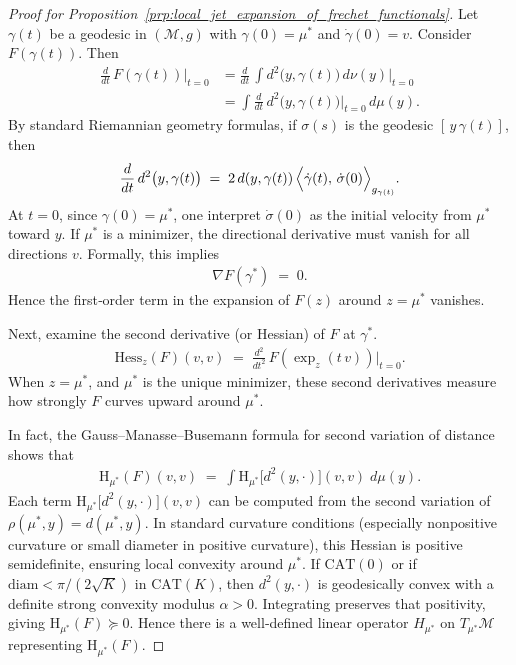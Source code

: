 \begin{proof}[Proof for Proposition~\ref{prp:local_jet_expansion_of_frechet_functionals}]
    Let \(\gamma(t)\) be a geodesic in \((\mathcal{M},g)\) with \(\gamma(0)=\mu^*\) and \(\dot{\gamma}(0)=v\).
    Consider \(F(\gamma(t))\).
    Then
    \begin{align*}
        \frac{d}{dt}\,F(\gamma(t))
        \Big|_{t=0}
        &=
        \frac{d}{dt}\,\int d^2\bigl(y,\gamma(t)\bigr)\,d\nu(y)
        \Big|_{t=0} \\
        &=
        \int \frac{d}{dt}\,d^2\bigl(y,\gamma(t)\bigr)
        \Big|_{t=0}
        \,d\mu(y).
    \end{align*}
    By standard Riemannian geometry formulas, if \(\sigma(s)\) is the geodesic \([\,y\,\gamma(t)]\), then
    \begin{align*}
        \frac{d}{dt}\,d^2\bigl(y,\gamma(t)\bigr)
        \;=\;
        2\,d(y,\gamma(t))
        \,\Bigl\langle 
           \dot{\gamma}(t),\,\dot{\sigma}(0)
        \Bigr\rangle_{g_{\gamma(t)}}.
    \end{align*}
   At \(t=0\), since \(\gamma(0)=\mu^*\), one interpret \(\dot{\sigma}(0)\) as the initial velocity from \(\mu^*\) toward \(y\).  
   If \(\mu^*\) is a minimizer, the directional derivative must vanish for all directions \(v\).
   Formally, this implies
   \begin{align*}
        \nabla F(\gamma^*)
        \;=\;
        0.
   \end{align*}
    Hence the first‐order term in the expansion of \(F(z)\) around \(z=\mu^*\) vanishes.  

    Next, examine the second derivative (or Hessian) of \(F\) at \(\gamma^*\).
    \begin{align*}
        \mathrm{Hess}_z(F)(v,v)
        \;=\;
        \frac{d^2}{dt^2}\,F(\exp_z(t\,v))
        \Big|_{t=0}.
    \end{align*}
    When \(z=\mu^*\), and \(\mu^*\) is the unique minimizer, these second derivatives measure how strongly \(F\) curves upward around \(\mu^*\).  

    In fact, the Gauss–Manasse–Busemann formula for second variation of distance shows that
    \begin{align*}
        \mathrm{H}_{\mu^*}(F)(v,v)
        \;=\;
        \int \mathrm{H}_{\mu^*}\bigl[d^2(y,\cdot)\bigr](v,v)
        \;d\mu(y).
    \end{align*}
    Each term \(\mathrm{H}_{\mu^*}\bigl[d^2(y,\cdot)\bigr](v,v)\) can be computed from the second variation of \(\rho(\mu^*,y)=d(\mu^*,y)\).
    In standard curvature conditions (especially nonpositive curvature or small diameter in positive curvature), this Hessian is positive semidefinite, ensuring local convexity around \(\mu^*\).
    If \(\mathrm{CAT}(0)\) or if \(\mathrm{diam}<\pi/(2\sqrt{K})\) in \(\mathrm{CAT}(K)\), then \(d^2(y,\cdot)\) is geodesically convex with a definite strong convexity modulus \(\alpha>0\).  
    Integrating preserves that positivity, giving \(\mathrm{H}_{\mu^*}(F)\succeq 0\).  
    Hence there is a well‐defined linear operator \(H_{\mu^*}\) on \(T_{\mu^*}\mathcal{M}\) representing \(\mathrm{H}_{\mu^*}(F)\).  


\end{proof}
